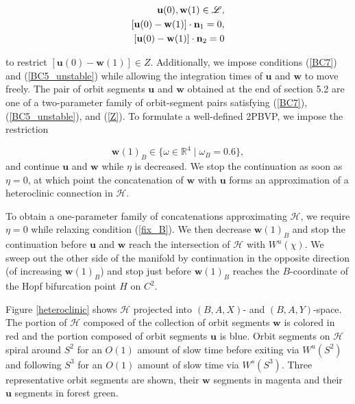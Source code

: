\documentclass{ws-ijbc}
\begin{document}
\begin{align}
	\begin{split}
		\mathbf{u}(0), \mathbf{w}(1) \in \mathscr{L},\\ \vspace{2mm}
		[\mathbf{u}(0) - \mathbf{w}(1)] \cdot \mathbf{n}_1 =0, \\ \vspace{2mm}
		[\mathbf{u}(0) - \mathbf{w}(1)] \cdot \mathbf{n}_2 =0
	\end{split}
	\label{Z}
\end{align}

\noindent
to restrict  $[\mathbf{u}(0) -\mathbf{w}(1)] \in Z$.  Additionally, we impose conditions (\ref{BC7}) and (\ref{BC5_unstable}) while allowing the integration times of $\mathbf{u}$ and $\mathbf{w}$ to move freely.  The pair of orbit segments $\mathbf{u}$ and $\mathbf{w}$ obtained at the end of section 5.2 are one of a two-parameter family of orbit-segment pairs satisfying (\ref{BC7}), (\ref{BC5_unstable}), and (\ref{Z}).  To formulate a well-defined 2PBVP, we impose the restriction

\begin{equation}
\mathbf{w}(1)_B \in \{ \omega \in \mathbb{R}^4 \; | \; \omega_B = 0.6 \},
\label{fix_B}
\end{equation}  
\noindent
and continue $\mathbf{u}$ and $\mathbf{w}$ while $\eta$ is decreased.  We stop the continuation as soon as $\eta = 0$, at which point the concatenation of $\mathbf{w}$ with $\mathbf{u}$ forms an approximation of a heteroclinic connection in $\mathscr{H}$.

To obtain a one-parameter family of concatenations approximating $\mathscr{H}$, we require $\eta = 0$ while relaxing condition (\ref{fix_B}).  We then decrease $\mathbf{w}(1)_B$ and stop the continuation before $\mathbf{u}$ and $\mathbf{w}$ reach the intersection of $\mathscr{H}$ with $W^u(\chi)$.  We sweep out the other side of the manifold by continuation in the opposite direction (of increasing $\mathbf{w}(1)_B$) and stop just before $\mathbf{w}(1)_B$ reaches the $B$-coordinate of the Hopf bifurcation point $H$ on $C^2$.

Figure \ref{heteroclinic} shows $\mathscr{H}$ projected into $(B,A,X)$- and $(B,A,Y)$-space.  The portion of $\mathscr{H}$ composed of the collection of orbit segments $\mathbf{w}$ is colored in red and the portion composed of orbit segments $\mathbf{u}$ is blue.  Orbit segments on $\mathscr{H}$ spiral around $S^2$ for an $O(1)$ amount of slow time before exiting via $W^u(S^2)$ and following $S^3$ for an $O(1)$ amount of slow time via $W^s(S^3)$.  Three representative orbit segments are shown, their $\mathbf{w}$ segments in magenta and their $\mathbf{u}$ segments in forest green.
\end{document}
